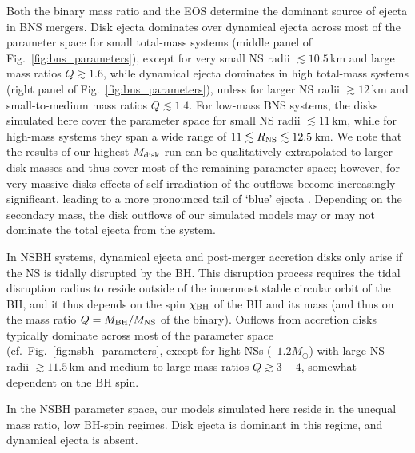 Both the binary mass ratio and the EOS determine the dominant source of ejecta in BNS mergers. Disk ejecta dominates over dynamical ejecta across most of the parameter space for small total-mass systems (middle panel of Fig.~\ref{fig:bns_parameters}), except for very small NS radii $\lesssim\!10.5$\,km and large mass ratios $Q\gtrsim 1.6$, while dynamical ejecta dominates in high total-mass systems (right panel of Fig.~\ref{fig:bns_parameters}), unless for larger NS radii $\gtrsim\!12$\,km and small-to-medium mass ratios $Q\lesssim 1.4$. For low-mass BNS systems, the disks simulated here cover the parameter space for small NS radii $\lesssim\!11$\,km, while for high-mass systems they span a wide range of $11\lesssim R_{\rm NS}\lesssim 12.5$\,km. We note that the results of our highest-$M_{\rm disk}$ run can be qualitatively extrapolated to larger disk masses and thus cover most of the remaining parameter space; however, for very massive disks effects of self-irradiation of the outflows become increasingly significant, leading to a more pronounced tail of `blue' ejecta \cite{miller_full_2019-1}. Depending on the secondary mass, the disk outflows of our simulated models may or may not dominate the total ejecta from the system.

In NSBH systems, dynamical ejecta and post-merger accretion disks only arise if the NS is tidally disrupted by the BH. This disruption process requires the tidal disruption radius to reside outside of the innermost stable circular orbit of the BH, and it thus depends on the spin $\chi_{\rm BH}$ of the BH and its mass (and thus on the mass ratio $Q = M_{\rm BH}/M_{\rm NS}$ of the binary). Ouflows from accretion disks typically dominate across most of the parameter space (cf.~Fig.~\ref{fig:nsbh_parameters}, except for light NSs (~$1.2M_\odot$) with large NS radii $\gtrsim 11.5$\,km and medium-to-large mass ratios $Q\gtrsim 3-4$, somewhat dependent on the BH spin.

In the NSBH parameter space, our models simulated here reside in the unequal mass ratio, low BH-spin regimes. Disk ejecta is dominant in this regime, and dynamical ejecta is absent.





